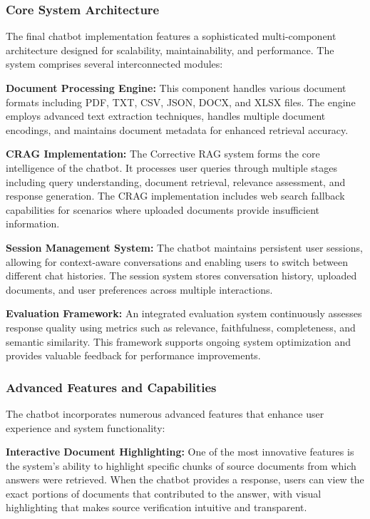 \documentclass[12pt,a4paper]{article}
\begin{document}
\subsubsection{Core System Architecture}

The final chatbot implementation features a sophisticated multi-component architecture designed for scalability, maintainability, and performance. The system comprises several interconnected modules:

\textbf{Document Processing Engine:} This component handles various document formats including PDF, TXT, CSV, JSON, DOCX, and XLSX files. The engine employs advanced text extraction techniques, handles multiple document encodings, and maintains document metadata for enhanced retrieval accuracy.

\textbf{CRAG Implementation:} The Corrective RAG system forms the core intelligence of the chatbot. It processes user queries through multiple stages including query understanding, document retrieval, relevance assessment, and response generation. The CRAG implementation includes web search fallback capabilities for scenarios where uploaded documents provide insufficient information.

\textbf{Session Management System:} The chatbot maintains persistent user sessions, allowing for context-aware conversations and enabling users to switch between different chat histories. The session system stores conversation history, uploaded documents, and user preferences across multiple interactions.

\textbf{Evaluation Framework:} An integrated evaluation system continuously assesses response quality using metrics such as relevance, faithfulness, completeness, and semantic similarity. This framework supports ongoing system optimization and provides valuable feedback for performance improvements.

\subsubsection{Advanced Features and Capabilities}

The chatbot incorporates numerous advanced features that enhance user experience and system functionality:

\textbf{Interactive Document Highlighting:} One of the most innovative features is the system's ability to highlight specific chunks of source documents from which answers were retrieved. When the chatbot provides a response, users can view the exact portions of documents that contributed to the answer, with visual highlighting that makes source verification intuitive and transparent.
\end{document}
